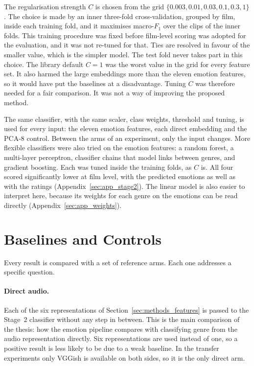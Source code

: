 The regularisation strength $C$ is chosen from the grid $\{0.003, 0.01, 0.03, 0.1, 0.3, 1\}$. The choice is made by an inner three-fold cross-validation, grouped by film, inside each training fold, and it maximises macro-$F_1$ over the clips of the inner folds. This training procedure was fixed before film-level scoring was adopted for the evaluation, and it was not re-tuned for that. Ties are resolved in favour of the smaller value, which is the simpler model. The test fold never takes part in this choice. The library default $C=1$ was the worst value in the grid for every feature set. It also harmed the large embeddings more than the eleven emotion features, so it would have put the baselines at a disadvantage. Tuning $C$ was therefore needed for a fair comparison. It was not a way of improving the proposed method.

The same classifier, with the same scaler, class weights, threshold and tuning, is used for every input: the eleven emotion features, each direct embedding and the PCA-8 control. Between the arms of an experiment, only the input changes. More flexible classifiers were also tried on the emotion features: a random forest, a multi-layer perceptron, classifier chains that model links between genres, and gradient boosting. Each was tuned inside the training folds, as $C$ is. All four scored significantly lower at film level, with the predicted emotions as well as with the ratings (Appendix~\ref{sec:app_stage2}). The linear model is also easier to interpret here, because its weights for each genre on the emotions can be read directly (Appendix~\ref{sec:app_weights}).

\section{Baselines and Controls}
\label{sec:methods_baselines}

Every result is compared with a set of reference arms. Each one addresses a specific question.

\paragraph{Direct audio.} Each of the six representations of Section~\ref{sec:methods_features} is passed to the Stage~2 classifier without any step in between. This is the main comparison of the thesis: how the emotion pipeline compares with classifying genre from the audio representation directly. Six representations are used instead of one, so a positive result is less likely to be due to a weak baseline. In the transfer experiments only VGGish is available on both sides, so it is the only direct arm.

